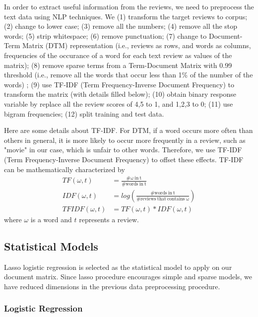 \documentclass[12pt]{article}
\begin{document}
In order to extract useful information from the reviews, we need to preprocess the text data using NLP techniques. We (1) transform the target reviews to corpus; (2) change to lower case; (3) remove all the numbers; (4) remove all the stop words; (5) strip whitespace;  (6) remove punctuation; (7) change to Document-Term Matrix (DTM) representation (i.e., reviews as rows, and words as columns, frequencies of the occurance of a word for each text review as values of the matrix); (8) remove sparse terms from a Term-Document Matrix with 0.99 threshold (i.e., remove all the words that occur less than 1\% of the number of the words) ; (9) use TF-IDF (Term Frequency-Inverse Document Frequency) to transform the matrix (with details filled below); (10) obtain binary response variable by replace all the review scores of 4,5 to 1, and 1,2,3 to 0; (11) use bigram frequencies; (12) split training and test data. 

Here are some details about TF-IDF. For DTM, if a word occurs more often than others in general, it is more likely to occur more frequently in a review, such as "movie" in our case, which is unfair to other words. Therefore, we use TF-IDF (Term Frequency-Inverse Document Frequency) to offset these effects. TF-IDF can be mathematically characterized by 
\begin{equation}
\begin{aligned}
TF(\omega,t)&=\frac{\mathrm{\#\omega~in~t}}{\mathrm{\#words~in~t}}\\
IDF(\omega,t)&=log(\frac{\mathrm{\#words~in~t}}{\mathrm{\#reviews~that~contains~\omega}})\\
TFIDF(\omega,t) &= TF(\omega,t)*IDF(\omega,t)
\end{aligned}
\end{equation}
where $\omega$ is a word and $t$ represents a review. 

\subsection{Statistical Models}

Lasso logistic regression is selected as the statistical model to apply on our document matrix. Since lasso procedure encourages simple and sparse models, we have reduced dimensions in the previous data preprocessing procedure. 

\subsubsection{Logistic Regression}
\end{document}
